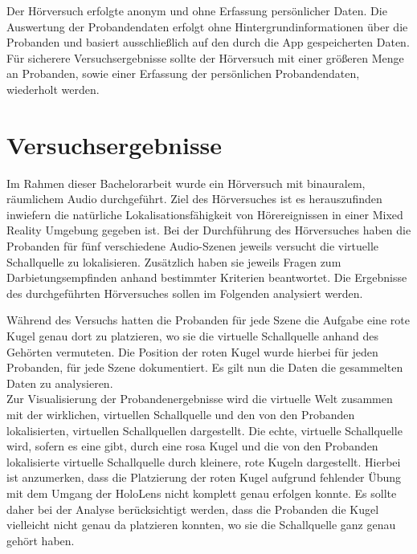  Der Hörversuch erfolgte anonym und ohne Erfassung persönlicher Daten. Die Auswertung der Probandendaten erfolgt ohne Hintergrundinformationen über die Probanden und basiert ausschließlich auf den durch die App gespeicherten Daten. Für sicherere Versuchsergebnisse sollte der Hörversuch mit einer größeren Menge an Probanden, sowie einer Erfassung der persönlichen Probandendaten, wiederholt werden.
 
 \chapter{Versuchsergebnisse}
 Im Rahmen dieser Bachelorarbeit wurde ein Hörversuch mit binauralem, räumlichem Audio durchgeführt. Ziel des Hörversuches ist es herauszufinden inwiefern die natürliche Lokalisationsfähigkeit von Hörereignissen in einer Mixed Reality Umgebung gegeben ist. Bei der Durchführung des Hörversuches haben die Probanden für fünf verschiedene Audio-Szenen jeweils versucht die virtuelle Schallquelle zu lokalisieren.  Zusätzlich haben sie jeweils Fragen zum Darbietungsempfinden anhand bestimmter Kriterien beantwortet.  Die Ergebnisse des durchgeführten Hörversuches sollen im Folgenden analysiert werden.
 
 Während des Versuchs hatten die Probanden für jede Szene die Aufgabe eine rote Kugel genau dort zu platzieren, wo sie die virtuelle Schallquelle anhand des Gehörten vermuteten. Die Position der roten Kugel wurde hierbei für jeden Probanden, für jede Szene dokumentiert. Es gilt nun die Daten die gesammelten Daten zu analysieren. \\
 
 Zur Visualisierung der Probandenergebnisse wird die virtuelle Welt zusammen mit der wirklichen, virtuellen Schallquelle und den von den Probanden lokalisierten, virtuellen Schallquellen dargestellt. Die echte, virtuelle Schallquelle wird, sofern es eine gibt, durch eine rosa Kugel und die von den Probanden lokalisierte virtuelle Schallquelle durch  kleinere, rote Kugeln dargestellt. Hierbei ist anzumerken, dass die Platzierung der roten Kugel aufgrund fehlender Übung mit dem Umgang der HoloLens nicht komplett genau erfolgen konnte. Es sollte daher bei der Analyse berücksichtigt werden, dass die Probanden die Kugel vielleicht nicht genau da platzieren konnten, wo sie die Schallquelle ganz genau gehört haben. 
 
